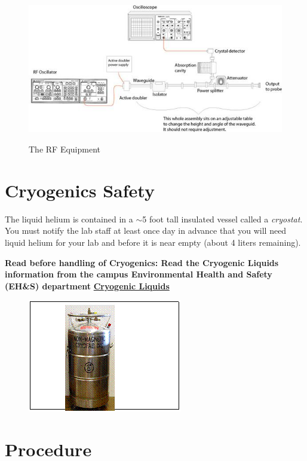 \documentclass{../lab}
\begin{document}
\begin{figure}[h]
    \centering
    \href{http://experimentationlab.berkeley.edu/sites/default/files/images/JOS9.jpg}{\includegraphics[width=0.7\linewidth]{images/JOS9.jpg}}
    \caption{The RF Equipment}
    \label{fig:RFEquipment}
\end{figure}

\section{Cryogenics Safety}

The liquid helium is contained in a $\sim$5 foot tall insulated vessel called a \emph{cryostat}. You must notify the lab staff at least once day in advance that you will need liquid helium for your lab and before it is near empty (about 4 liters remaining).

\textbf{Read before handling of Cryogenics: Read the Cryogenic Liquids information from the campus Environmental Health and Safety (EH\&S) department } \href{http://experimentationlab.berkeley.edu/sites/default/files/images/77cryogenic.pdf}{\textbf{Cryogenic Liquids}}

\begin{figure}[h]
    \centering
    \href{http://experimentationlab.berkeley.edu/sites/default/files/images/JOS10.gif}{\includegraphics[width=0.4\linewidth]{images/JOS10.png}}
    \caption{}
    \label{fig:JOS10}
\end{figure}

\section{Procedure}
\end{document}
